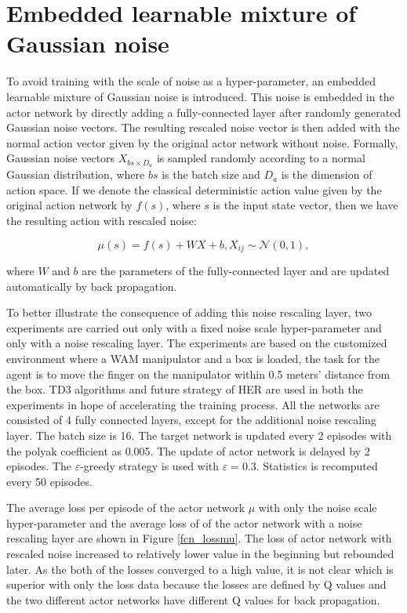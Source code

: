 \documentclass[a4paper, 12pt]{report}
\begin{document}
    \section{Embedded learnable mixture of Gaussian noise}
    
    To avoid training with the scale of noise as a hyper-parameter, an embedded learnable mixture of Gaussian noise is introduced. This noise is embedded in the actor network by directly adding a fully-connected layer after randomly generated Gaussian noise vectors. The resulting rescaled noise vector is then added with the normal action vector given by the original actor network without noise. Formally, Gaussian noise vectors $X_{bs\times D_a}$ is sampled randomly according to a normal Gaussian distribution, where $bs$ is the batch size and $D_a$ is the dimension of action space. If we denote the classical deterministic action value given by the original action network by $f(s)$, where $s$ is the input state vector, then we have the resulting action with rescaled noise:

    $$ \mu(s) = f(s) + W X + b, X_{ij}\sim\mathcal N(0,1),$$

    where $W$ and $b$ are the parameters of the fully-connected layer and are updated automatically by back propagation.

    To better illustrate the consequence of adding this noise rescaling layer, two experiments are carried out only with a fixed noise scale hyper-parameter and only with a noise rescaling layer. The experiments are based on the customized environment where a WAM manipulator and a box is loaded, the task for the agent is to move the finger on the manipulator within 0.5 meters' distance from the box. TD3 algorithms and future strategy of HER are used in both the experiments in hope of accelerating the training process. All the networks are consisted of 4 fully connected layers, except for the additional noise rescaling layer. The batch size is 16. The target network is updated every 2 episodes with the polyak coefficient as 0.005. The update of actor network is delayed by 2 episodes. The $\varepsilon$-greedy strategy is used with $\varepsilon=0.3$. Statistics is recomputed every 50 episodes.
    

    The average loss per episode of the actor network $\mu$ with only the noise scale hyper-parameter and the average loss of of the actor network with a noise rescaling layer are shown in Figure \ref{fcn_lossmu}. The loss of actor network with rescaled noise increased to relatively lower value in the beginning but rebounded later. As the both of the losses converged to a high value, it is not clear which is superior with only the loss data because the losses are defined by Q values and the two different actor networks have different Q values for back propagation.
\end{document}
